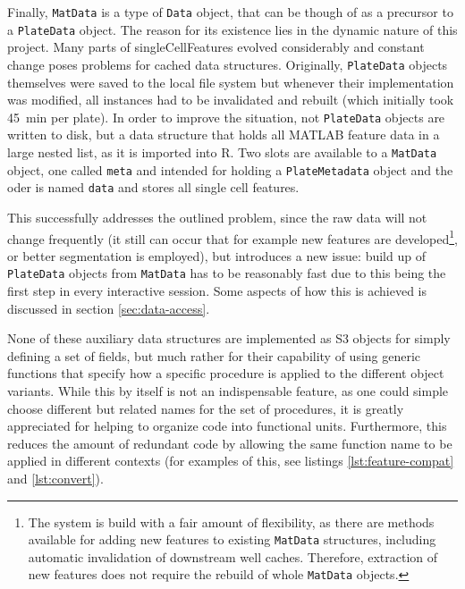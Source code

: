 Finally, \texttt{MatData} is a type of \texttt{Data} object, that can be though of as a precursor to a \texttt{PlateData} object. The reason for its existence lies in the dynamic nature of this project. Many parts of singleCellFeatures evolved considerably and constant change poses problems for cached data structures. Originally, \texttt{PlateData} objects themselves were saved to the local file system but whenever their implementation was modified, all instances had to be invalidated and rebuilt (which initially took \tilde\SI{45}{\minute} per plate). In order to improve the situation, not \texttt{PlateData} objects are written to disk, but a data structure that holds all MATLAB feature data in a large nested list, as it is imported into R. Two slots are available to a \texttt{MatData} object, one called \texttt{meta} and intended for holding a \texttt{PlateMetadata} object and the oder is named \texttt{data} and stores all single cell features.

This successfully addresses the outlined problem, since the raw data will not change frequently (it still can occur that for example new features are developed\footnote{The system is build with a fair amount of flexibility, as there are methods available for adding new features to existing \texttt{MatData} structures, including automatic invalidation of downstream well caches. Therefore, extraction of new features does not require the rebuild of whole \texttt{MatData} objects.}, or better segmentation is employed), but introduces a new issue: build up of \texttt{PlateData} objects from \texttt{MatData} has to be reasonably fast due to this being the first step in every interactive session. Some aspects of how this is achieved is discussed in section \ref{sec:data-access}.

None of these auxiliary data structures are implemented as S3 objects for simply defining a set of fields, but much rather for their capability of using generic functions that specify how a specific procedure is applied to the different object variants. While this by itself is not an indispensable feature, as one could simple choose different but related names for the set of procedures, it is greatly appreciated for helping to organize code into functional units. Furthermore, this reduces the amount of redundant code by allowing the same function name to be applied in different contexts (for examples of this, see listings \ref{lst:feature-compat} and \ref{lst:convert}).

